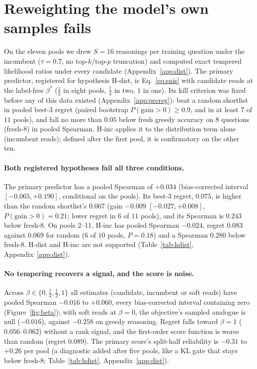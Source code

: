 \section{Reweighting the model's own samples fails}
\label{sec:exp-validity}
On the eleven pools we drew $S=16$ reasonings per training question under the incumbent
($\tau=0.7$, no top-$k$/top-$p$ truncation) and computed exact tempered likelihood ratios under
every candidate (Appendix~\ref{app:dist}). The primary predictor, registered for hypothesis
H-dist, is Eq.~\ref{eq:snis} with candidate reads at the label-free $\beta^\ast$ ($\tfrac12$ in
eight pools, $\tfrac14$ in two, $1$ in one). Its kill criterion was fixed before any of this data
existed (Appendix~\ref{app:prereg}): beat a random shortlist in pooled best-3 regret (paired
bootstrap $P(\text{gain}>0)\ge0.9$, and in at least $7$ of $11$ pools), and fall no more than $0.05$
below fresh greedy accuracy on $8$ questions (fresh-8) in pooled Spearman. H-inc applies it to the
distribution term alone (incumbent reads); defined after the first pool, it is confirmatory on the
other ten.

\paragraph{Both registered hypotheses fail all three conditions.} The primary predictor has a
pooled Spearman of $+0.034$ (bias-corrected interval $[-0.065,+0.190]$, conditional on the pools).
Its best-3 regret, $0.075$, is higher than the random shortlist's $0.067$ (gain $-0.009$
$[-0.027,+0.008]$, $P(\text{gain}>0)=0.21$; lower regret in $6$ of $11$ pools), and its Spearman is
$0.243$ below fresh-8. On pools 2--11, H-inc has pooled Spearman $-0.024$, regret $0.083$ against
$0.069$ for random ($6$ of $10$ pools, $P=0.18$) and a Spearman $0.280$ below fresh-8. H-dist and
H-inc are not supported (Table~\ref{tab:hdist}, Appendix~\ref{app:dist}).

\paragraph{No tempering recovers a signal, and the score is noise.} Across
$\beta\in\{0,\tfrac14,\tfrac12,1\}$ all estimates (candidate, incumbent or soft reads) have pooled
Spearman $-0.016$ to $+0.060$, every bias-corrected interval containing zero
(Figure~\ref{fig:beta}); with soft reads at $\beta=0$, the objective's sampled analogue is null
($-0.016$), against $-0.258$ on greedy reasoning. Regret falls toward $\beta=1$ ($0.056$--$0.062$)
without a rank signal, and the first-order score function is worse than random (regret $0.089$).
The primary score's split-half reliability is $-0.31$ to $+0.26$ per pool (a diagnostic added after
five pools, like a KL gate that stays below fresh-8; Table~\ref{tab:hdist}, Appendix~\ref{app:dist}).

